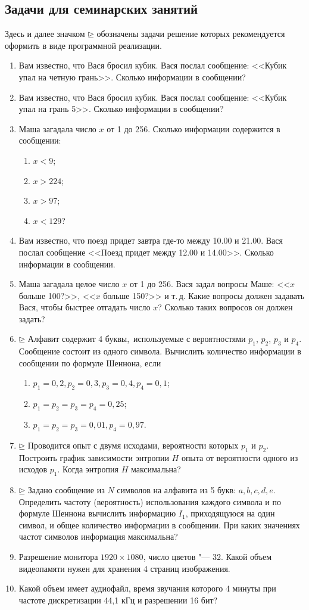 \documentclass[b5paper,11pt]{book}
\begin{document}
	\subsection{Задачи для семинарских занятий}
		Здесь и далее значком $\unrhd$ обозначены задачи решение которых рекомендуется оформить в виде программной реализации.
		\begin{enumerate}
			\item Вам известно, что Вася бросил кубик. Вася послал сообщение: <<Кубик упал на четную грань>>. Сколько информации в сообщении?
			\item Вам известно, что Вася бросил кубик. Вася послал сообщение: <<Кубик упал на грань 5>>. Сколько информации в сообщении?
			\item Маша загадала число $x$ от 1 до 256. Сколько информации содержится в сообщении: 
				\begin{enumerate}
					\item $x < 9$;
					\item $x > 224$;
					\item $x > 97$;
					\item $x < 129$?
				\end{enumerate}
			\item Вам известно, что поезд придет завтра где-то между 10.00 и 21.00. Вася послал сообщение <<Поезд придет между 12.00 и 14.00>>. Сколько информации в сообщении.
			\item Маша загадала целое число $x$ от 1 до 256. Вася задал вопросы Маше: <<$x$ больше 100?>>, <<$x$ больше 150?>> и т.\,д. Какие вопросы должен задавать Вася, чтобы быстрее отгадать число $x$? Сколько таких вопросов он должен задать?
			\item $\unrhd$ Алфавит содержит 4 буквы,~используемые с вероятностями $p_1$, $p_2$, $p_3$ и $p_4$. Сообщение состоит из одного символа. Вычислить количество информации в сообщении по формуле Шеннона, если
				\begin{enumerate}
					\item $p_1=0,2, p_2=0,3, p_3=0,4, p_4=0,1$;
					\item $p_1=p_2=p_3=p_4=0,25$;
					\item $p_1=p_2=p_3=0,01, p_4=0,97$.
				\end{enumerate}
			\item $\unrhd$ Проводится опыт с двумя исходами, вероятности которых $p_1$ и $p_2$. Построить график зависимости энтропии $H$ опыта от вероятности одного из исходов $p_1$. Когда энтропия $H$ максимальна?
			\item $\unrhd$ Задано сообщение из $N$ символов на алфавита из 5 букв: $a,b,c,d,e$. Определить частоту (вероятность) использования каждого символа и по формуле Шеннона вычислить информацию $I_1$, приходящуюся на один символ, и общее количество информации в сообщении. При каких значениях частот символов информация максимальна?
			\item Разрешение монитора $1920\times 1080$, число цветов "--- 32. Какой объем видеопамяти нужен для хранения 4 страниц изображения.
			\item Какой объем имеет аудиофайл, время звучания которого 4 минуты при частоте дискретизации 44,1 кГц и разрешении 16 бит?
		\end{enumerate}
\end{document}
